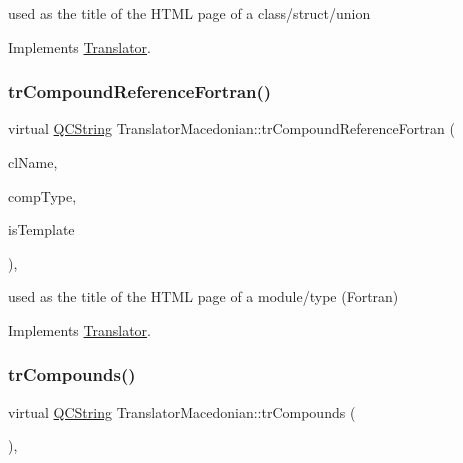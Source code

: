 used as the title of the H\+T\+ML page of a class/struct/union 

Implements \mbox{\hyperlink{class_translator}{Translator}}.

\mbox{\label{class_translator_macedonian_a9af65190c5529cb48b130d1c57ac79e0}} 
\subsubsection{\texorpdfstring{trCompoundReferenceFortran()}{trCompoundReferenceFortran()}}
{\footnotesize\ttfamily virtual \mbox{\hyperlink{class_q_c_string}{Q\+C\+String}} Translator\+Macedonian\+::tr\+Compound\+Reference\+Fortran (\begin{DoxyParamCaption}\item[{const char $\ast$}]{cl\+Name,  }\item[{\mbox{\hyperlink{class_class_def_ae70cf86d35fe954a94c566fbcfc87939}{Class\+Def\+::\+Compound\+Type}}}]{comp\+Type,  }\item[{bool}]{is\+Template }\end{DoxyParamCaption})\hspace{0.3cm}{\ttfamily [inline]}, {\ttfamily [virtual]}}

used as the title of the H\+T\+ML page of a module/type (Fortran) 

Implements \mbox{\hyperlink{class_translator}{Translator}}.

\mbox{\label{class_translator_macedonian_a973fa9cab9cd6283209ebf40b31c611b}} 
\subsubsection{\texorpdfstring{trCompounds()}{trCompounds()}}
{\footnotesize\ttfamily virtual \mbox{\hyperlink{class_q_c_string}{Q\+C\+String}} Translator\+Macedonian\+::tr\+Compounds (\begin{DoxyParamCaption}{ }\end{DoxyParamCaption})\hspace{0.3cm}{\ttfamily [inline]}, {\ttfamily [virtual]}}

